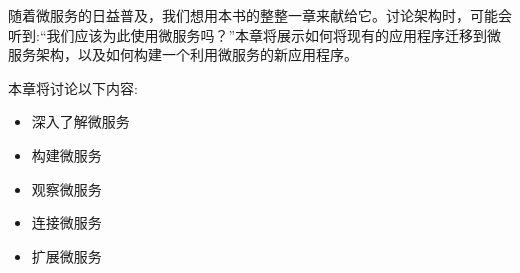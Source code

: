 
随着微服务的日益普及，我们想用本书的整整一章来献给它。讨论架构时，可能会听到:“我们应该为此使用微服务吗？”本章将展示如何将现有的应用程序迁移到微服务架构，以及如何构建一个利用微服务的新应用程序。

本章将讨论以下内容:

\begin{itemize}
\item 
深入了解微服务

\item 
构建微服务

\item 
观察微服务

\item 
连接微服务

\item 
扩展微服务
\end{itemize}